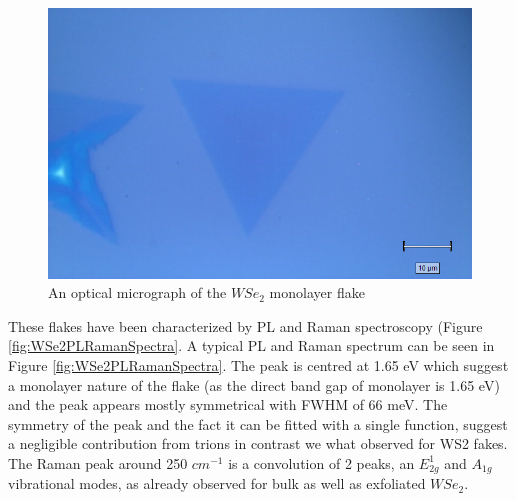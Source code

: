 
\begin{figure}[!h]
	\begin{center}
		\includegraphics[scale=0.5]{WSe2/OMMap.png}
		\caption{An optical micrograph of the $WSe_2$ monolayer flake}
		\label{fig:WSe2OMMap}
	\end{center}
\end{figure}

These flakes have been characterized by PL and Raman spectroscopy (Figure \ref{fig:WSe2PLRamanSpectra}. A typical PL and Raman spectrum can be seen in Figure \ref{fig:WSe2PLRamanSpectra}. The peak is centred at 1.65 eV which suggest a monolayer nature of the flake (as the direct band gap of monolayer is 1.65 eV) and the peak appears mostly symmetrical with FWHM of 66 meV. The symmetry of the peak and the fact it can be fitted with a single function, suggest a negligible contribution from trions in contrast we what observed for WS2  fakes. The Raman peak around 250 $cm^{-1}$ is a convolution of 2 peaks, an $E^1_{2g}$ and $A_{1g}$ vibrational modes, as already observed for bulk as well as exfoliated $WSe_2$.

